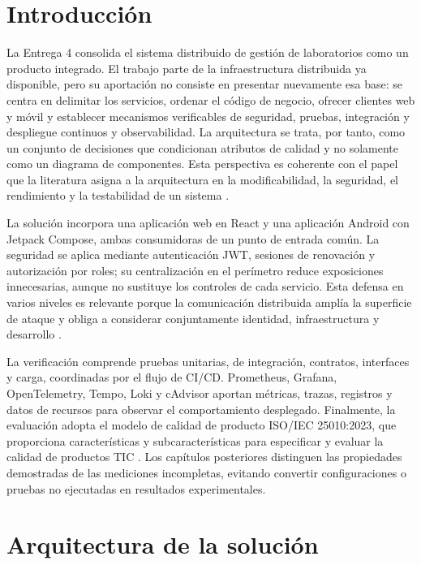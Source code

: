\section{Introducción}
\label{sec:introduccion-e4}

La Entrega 4 consolida el sistema distribuido de gestión de laboratorios como
un producto integrado. El trabajo parte de la infraestructura distribuida ya
disponible, pero su aportación no consiste en presentar nuevamente esa base: se
centra en delimitar los servicios, ordenar el código de negocio, ofrecer clientes
web y móvil y establecer mecanismos verificables de seguridad, pruebas,
integración y despliegue continuos y observabilidad. La arquitectura se trata,
por tanto, como un conjunto de decisiones que condicionan atributos de calidad
y no solamente como un diagrama de componentes. Esta perspectiva es coherente
con el papel que la literatura asigna a la arquitectura en la modificabilidad,
la seguridad, el rendimiento y la testabilidad de un sistema
\cite{bass2021softwarearchitecture}.

La solución incorpora una aplicación web en React y una aplicación Android con
Jetpack Compose, ambas consumidoras de un punto de entrada común. La seguridad
se aplica mediante autenticación JWT, sesiones de renovación y autorización por
roles; su centralización en el perímetro reduce exposiciones innecesarias, aunque
no sustituye los controles de cada servicio. Esta defensa en varios niveles es
relevante porque la comunicación distribuida amplía la superficie de ataque y
obliga a considerar conjuntamente identidad, infraestructura y desarrollo
\cite{berardi2022microservicesecurity}.

La verificación comprende pruebas unitarias, de integración, contratos,
interfaces y carga, coordinadas por el flujo de CI/CD. Prometheus, Grafana,
OpenTelemetry, Tempo, Loki y cAdvisor aportan métricas, trazas, registros y datos
de recursos para observar el comportamiento desplegado. Finalmente, la
evaluación adopta el modelo de calidad de producto ISO/IEC 25010:2023, que
proporciona características y subcaracterísticas para especificar y evaluar la
calidad de productos TIC \cite{iso25010_2023}. Los capítulos posteriores
distinguen las propiedades demostradas de las mediciones incompletas, evitando
convertir configuraciones o pruebas no ejecutadas en resultados experimentales.

\section{Arquitectura de la solución}
\label{sec:arquitectura-solucion}

